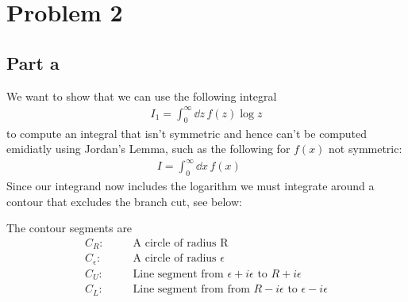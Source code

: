 \documentclass[a4paper,12pt]{article}
\begin{document}
\section*{Problem 2}
\subsection*{Part a}
We want to show that we can use the following integral
\begin{equation}
\begin{aligned}
I_1=\int_0^\infty \dd z\, f(z)\log z
\end{aligned}
\end{equation}
to compute an integral that isn't symmetric and hence can't be computed emidiatly using Jordan's Lemma, such as the following for $f(x)$ not symmetric:
\begin{equation}
	\begin{aligned}
		I=\int_0^\infty \dd x\, f(x)~~~~~~
	\end{aligned}
\end{equation}
Since our integrand now includes the logarithm we must integrate around a contour that excludes the branch cut, see below:
\begin{figure}[H]
	\centering
\end{figure}
The contour segments are
\begin{equation}
\begin{aligned}
C_R:&~~~~~~~~\text{A circle of radius R}\\
C_\epsilon:&~~~~~~~~\text{A circle of radius }\epsilon\\
C_U:&~~~~~~~~\text{Line segment from $\epsilon+i\epsilon$ to $R+i\epsilon$}\\
C_L:&~~~~~~~~\text{Line segment from from $R-i\epsilon$ to $\epsilon-i\epsilon$}
\end{aligned}
\end{equation}
\end{document}
